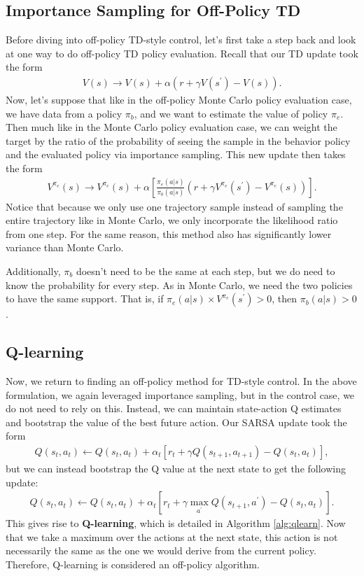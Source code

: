 \documentclass{article}
\theoremstyle{definition}
\theoremstyle{remark}
\begin{document}
\subsection{Importance Sampling for Off-Policy TD}
Before diving into off-policy TD-style control, let's first take a step back and look at one way to do off-policy TD policy evaluation.  Recall that our TD update took the form
\begin{align*}
V(s) \rightarrow V(s) + \alpha (r + \gamma V(s^\prime) - V(s)).
\end{align*}
Now, let's suppose that like in the off-policy Monte Carlo policy evaluation case, we have data from a policy $\pi_b$, and we want to estimate the value of policy $\pi_e$.  Then much like in the Monte Carlo policy evaluation case, we can weight the target by the ratio of the probability of seeing the sample in the behavior policy and the evaluated policy via importance sampling.  This new update then takes the form
\begin{align*}
V^{\pi_e}(s) \rightarrow V^{\pi_e}(s) + \alpha \left[\frac{\pi_e(a|s)}{\pi_b(a|s)} (r + \gamma V^{\pi_e}(s^\prime) - V^{\pi_e}(s))\right].
\end{align*}
Notice that because we only use one trajectory sample instead of sampling the entire trajectory like in Monte Carlo, we only incorporate the likelihood ratio from one step. For the same reason, this method also has significantly lower variance than Monte Carlo.

Additionally, $\pi_b$ doesn't need to be the same at each step, but we do need to know the probability for every step.  As in Monte Carlo, we need the two policies to have the same support.  That is, if $\pi_e(a|s) \times V^{\pi_e}(s^\prime) > 0$, then $\pi_b(a|s) > 0$.

\subsection{Q-learning}
Now, we return to finding an off-policy method for TD-style control.  In the above formulation, we again leveraged importance sampling, but in the control case, we do not need to rely on this.  Instead, we can maintain state-action Q estimates and bootstrap the value of the best future action.  Our SARSA update took the form
\begin{align*}
Q(s_t, a_t) \gets Q(s_t, a_t) + \alpha_t [r_t+\gamma Q(s_{t+1}, a_{t+1}) - Q(s_t, a_t)],
\end{align*}
but we can instead bootstrap the Q value at the next state to get the following update:
\begin{align*}
Q(s_t, a_t) \gets Q(s_t, a_t) + \alpha_t [r_t+\gamma \max_{a^\prime} Q(s_{t+1}, a^\prime) - Q(s_t, a_t)].
\end{align*}
This gives rise to \textbf{Q-learning}, which is detailed in Algorithm \ref{alg:qlearn}.  Now that we take a maximum over the actions at the next state, this action is not necessarily the same as the one we would derive from the current policy.  Therefore, Q-learning is considered an off-policy algorithm.
\end{document}
